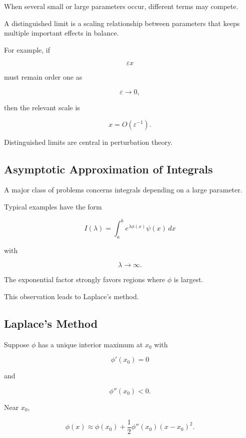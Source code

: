 When several small or large parameters occur, different terms may
compete.

A distinguished limit is a scaling relationship between parameters that
keeps multiple important effects in balance.

For example, if

\[
\varepsilon x
\]

must remain order one as

\[
\varepsilon\to0,
\]

then the relevant scale is

\[
\boxed{
x=O(\varepsilon^{-1}).
}
\]

Distinguished limits are central in perturbation theory.

\subsection{Asymptotic Approximation of Integrals}
\label{subsec:asymptotic-integrals}

A major class of problems concerns integrals depending on a large
parameter.

Typical examples have the form

\[
\boxed{
I(\lambda)
=
\int_a^b
e^{\lambda\phi(x)}
\psi(x)\,dx
}
\]

with

\[
\lambda\to\infty.
\]

The exponential factor strongly favors regions where \(\phi\) is largest.

This observation leads to Laplace's method.

\subsection{Laplace's Method}
\label{subsec:laplaces-method}

Suppose \(\phi\) has a unique interior maximum at \(x_0\) with

\[
\phi'(x_0)=0
\]

and

\[
\phi''(x_0)<0.
\]

Near \(x_0\),

\[
\phi(x)
\approx
\phi(x_0)
+
\frac12\phi''(x_0)(x-x_0)^2.
\]

